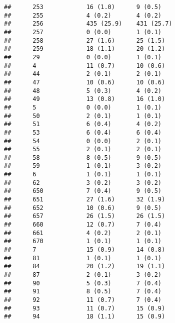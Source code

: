 \documentclass[]{article}
\begin{document}
\begin{verbatim}
##      253            16 (1.0)      9 (0.5)                        
##      255            4 (0.2)       4 (0.2)                        
##      256            435 (25.9)    431 (25.7)                     
##      257            0 (0.0)       1 (0.1)                        
##      258            27 (1.6)      25 (1.5)                       
##      259            18 (1.1)      20 (1.2)                       
##      29             0 (0.0)       1 (0.1)                        
##      4              11 (0.7)      10 (0.6)                       
##      44             2 (0.1)       2 (0.1)                        
##      47             10 (0.6)      10 (0.6)                       
##      48             5 (0.3)       4 (0.2)                        
##      49             13 (0.8)      16 (1.0)                       
##      5              0 (0.0)       1 (0.1)                        
##      50             2 (0.1)       1 (0.1)                        
##      51             6 (0.4)       4 (0.2)                        
##      53             6 (0.4)       6 (0.4)                        
##      54             0 (0.0)       2 (0.1)                        
##      55             2 (0.1)       2 (0.1)                        
##      58             8 (0.5)       9 (0.5)                        
##      59             1 (0.1)       3 (0.2)                        
##      6              1 (0.1)       1 (0.1)                        
##      62             3 (0.2)       3 (0.2)                        
##      650            7 (0.4)       9 (0.5)                        
##      651            27 (1.6)      32 (1.9)                       
##      652            10 (0.6)      9 (0.5)                        
##      657            26 (1.5)      26 (1.5)                       
##      660            12 (0.7)      7 (0.4)                        
##      661            4 (0.2)       2 (0.1)                        
##      670            1 (0.1)       1 (0.1)                        
##      7              15 (0.9)      14 (0.8)                       
##      81             1 (0.1)       1 (0.1)                        
##      84             20 (1.2)      19 (1.1)                       
##      87             2 (0.1)       3 (0.2)                        
##      90             5 (0.3)       7 (0.4)                        
##      91             8 (0.5)       7 (0.4)                        
##      92             11 (0.7)      7 (0.4)                        
##      93             11 (0.7)      15 (0.9)                       
##      94             18 (1.1)      15 (0.9)                       

\end{verbatim}
\end{document}
